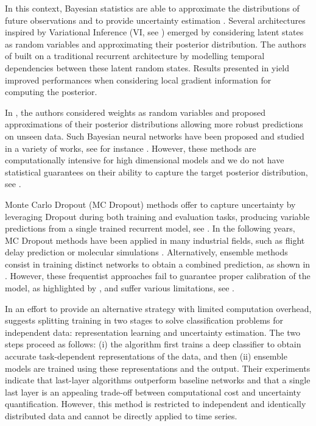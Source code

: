 \documentclass[journal]{IEEEtran}
\begin{document}
In this context, Bayesian statistics are able to approximate the distributions of future observations and to provide uncertainty estimation \cite{Hinton1995BayesianLF}.
Several architectures inspired by Variational Inference (VI, see \cite{Jordan2004AnIT}) emerged by considering latent states as random variables and approximating their posterior distribution.
The authors of \cite{Chung2015NIPS,10.5555/3157096.3157343} built on a traditional recurrent architecture by modelling temporal dependencies between these latent random states. Results presented in \cite{Fortunato2017bayesian} yield improved performances when considering local gradient information for computing the posterior.


In \cite{Blundell2015}, the authors considered weights as random variables and proposed approximations of their posterior distributions allowing more robust predictions on unseen data. Such Bayesian neural networks have been proposed and studied in a variety of works, see for instance \cite{hernandez2015probabilistic,khan2018fast,teye2018bayesian}. However, these methods are computationally intensive for high dimensional models and we do not have statistical guarantees on their ability to capture the target  posterior distribution, see \cite{NEURIPS2020_b6dfd418}.

Monte Carlo Dropout (MC Dropout) methods offer to capture uncertainty by leveraging Dropout during both training and evaluation tasks, producing variable predictions from a single trained recurrent model, see \cite{Gal2016NIPS}.
In the following years, MC Dropout methods have been applied in many industrial fields, such as flight delay prediction \cite{Vandal2018} or molecular simulations \cite{Wen2020UncertaintyQI}.
Alternatively, ensemble methods consist in training distinct networks to obtain a combined prediction, as shown in \cite{Pearce2018}.
However, these frequentist approaches fail to guarantee proper calibration of the model, as highlighted by \cite{ashukha2020pitfalls}, and suffer various limitations, see \cite{Fong2020}.

In an effort to provide an alternative strategy with limited computation overhead, \cite{Brosse2020OnLA} suggests splitting training in two stages to solve classification problems for independent data: representation learning and uncertainty estimation. The two steps proceed as follows: (i) the algorithm first trains a deep classifier to obtain accurate task-dependent representations of the data, and then (ii) ensemble models are trained using these representations and the output. Their experiments indicate that last-layer algorithms outperform baseline networks and that a single last layer is an appealing trade-off between computational cost and uncertainty quantification. However, this method is restricted to independent and identically distributed data and cannot be directly applied to time series.
\end{document}
